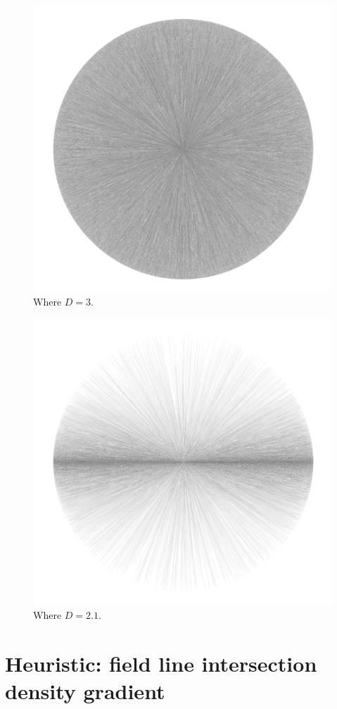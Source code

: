 \documentclass[12pt]{article}
\begin{document}
\begin{figure} 
\centering
\label{fig1}
  \includegraphics[width = 4 in]{3.png}
  \caption{
Where $D = 3$.
}
\end{figure}

\begin{figure} 
\centering
\label{fig2}
  \includegraphics[width = 4 in]{2.1.png}
  \caption{
Where $D = 2.1$.
}
\end{figure}




\section{Heuristic: field line intersection density gradient}
\end{document}

